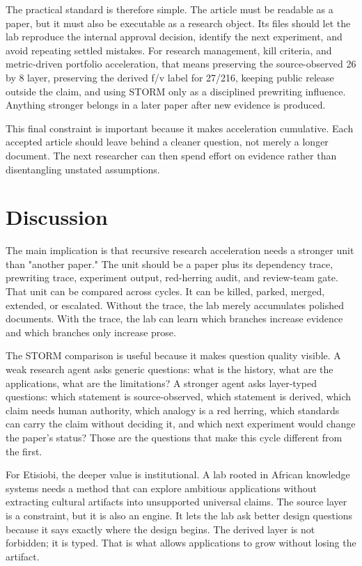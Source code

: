 \documentclass[sigconf,nonacm]{acmart}
\begin{document}
The practical standard is therefore simple. The article must be readable as a
paper, but it must also be executable as a research object. Its files should let
the lab reproduce the internal approval decision, identify the next experiment,
and avoid repeating settled mistakes. For research management, kill criteria, and metric-driven portfolio acceleration, that means preserving the
source-observed 26 by 8 layer, preserving the derived f/v label for 27/216,
keeping public release outside the claim, and using STORM only as a disciplined
prewriting influence. Anything stronger belongs in a later paper after new
evidence is produced.

This final constraint is important because it makes acceleration cumulative.
Each accepted article should leave behind a cleaner question, not merely a
longer document. The next researcher can then spend effort on evidence rather
than disentangling unstated assumptions.


\section{Discussion}
The main implication is that recursive research acceleration needs a stronger
unit than "another paper." The unit should be a paper plus its dependency trace,
prewriting trace, experiment output, red-herring audit, and review-team gate.
That unit can be compared across cycles. It can be killed, parked, merged,
extended, or escalated. Without the trace, the lab merely accumulates polished
documents. With the trace, the lab can learn which branches increase evidence
and which branches only increase prose.

The STORM comparison is useful because it makes question quality visible. A
weak research agent asks generic questions: what is the history, what are the
applications, what are the limitations? A stronger agent asks layer-typed
questions: which statement is source-observed, which statement is derived, which
claim needs human authority, which analogy is a red herring, which standards can
carry the claim without deciding it, and which next experiment would change the
paper's status? Those are the questions that make this cycle different from the
first.

For Etisiobi, the deeper value is institutional. A lab rooted in African
knowledge systems needs a method that can explore ambitious applications
without extracting cultural artifacts into unsupported universal claims. The
source layer is a constraint, but it is also an engine. It lets the lab ask
better design questions because it says exactly where the design begins. The
derived layer is not forbidden; it is typed. That is what allows applications to
grow without losing the artifact.
\end{document}
